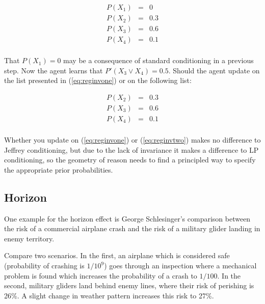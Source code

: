 \documentclass[11pt]{article}
\begin{document}
\begin{equation}
  \label{eq:reginvone}
  \begin{array}{rcl}
    P(X_{1})&=&0\\
    P(X_{2})&=&0.3\\
    P(X_{3})&=&0.6\\
    P(X_{4})&=&0.1\\
  \end{array}
\end{equation}

That $P(X_{1})=0$ may be a consequence of standard conditioning in a
previous step. Now the agent learns that $P'(X_{3}\vee{}X_{4})=0.5$.
Should the agent update on the list presented in (\ref{eq:reginvone})
or on the following list:

\begin{equation}
  \label{eq:reginvtwo}
  \begin{array}{rcl}
    P(X_{2})&=&0.3\\
    P(X_{3})&=&0.6\\
    P(X_{4})&=&0.1\\
  \end{array}
\end{equation}

Whether you update on (\ref{eq:reginvone}) or (\ref{eq:reginvtwo})
makes no difference to Jeffrey conditioning, but due to the lack of
invariance it makes a difference to LP conditioning, so the geometry
of reason needs to find a principled way to specify the appropriate
prior probabilities. 

\subsection{Horizon}
\label{Horizon}

One example for the horizon effect is George Schlesinger's comparison
between the risk of a commercial airplane crash and the risk of a
military glider landing in enemy territory.

\begin{quotex}
  \label{ex:schlesinger} Compare two
  scenarios. In the first, an airplane which is considered safe
  (probability of crashing is $1/10^{9}$) goes through an inspection
  where a mechanical problem is found which increases the probability
  of a crash to $1/100$. In the second, military gliders land behind
  enemy lines, where their risk of perishing is 26\%. A slight change
  in weather pattern increases this risk to 27\%.
\end{quotex}
\end{document}
